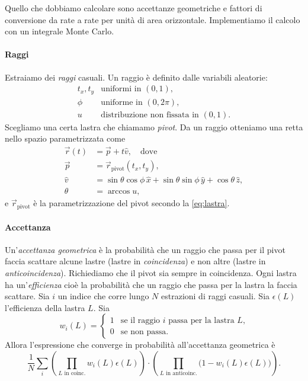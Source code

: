 Quello che dobbiamo calcolare sono accettanze geometriche
e fattori di conversione da rate a rate per unità di area orizzontale.
Implementiamo il calcolo con un integrale Monte Carlo.

\paragraph{Raggi}

Estraiamo dei \emph{raggi} casuali.
Un raggio è definito dalle variabili aleatorie:
\begin{equation*}
	\begin{array}{ll}
		t_x, t_y & \text{uniformi in $(0,1)$}, \\
		\phi     & \text{uniforme in $(0,2\pi)$}, \\
		u        & \text{distribuzione non fissata in $(0,1)$}.
	\end{array}
\end{equation*}
Scegliamo una certa lastra che chiamamo \emph{pivot}.
Da un raggio otteniamo una retta nello spazio parametrizzata come
\begin{align*}
	\vec r(t) &= \vec p + t \hat v, \quad \text{dove} \\
	\vec p    &= \vec r_\text{pivot}(t_x, t_y), \\
	\hat v    &= \sin\theta\cos\phi\,\hat x + \sin\theta\sin\phi\,\hat y + \cos\theta\,\hat z, \\
	\theta    &= \arccos u,
\end{align*}
e $\vec r_\text{pivot}$ è la parametrizzazione del pivot secondo la \eqref{eq:lastra}.

\paragraph{Accettanza}

Un'\emph{accettanza geometrica} è la probabilità
che un raggio che passa per il pivot
faccia scattare alcune lastre (lastre in \emph{coincidenza})
e non altre (lastre in \emph{anticoincidenza}).
Richiediamo che il pivot sia sempre in coincidenza.
Ogni lastra ha un'\emph{efficienza}
cioè la probabilità che un raggio che passa per la lastra la faccia scattare.
Sia $i$ un indice che corre lungo $N$ estrazioni di raggi casuali.
Sia $\epsilon(L)$ l'efficienza della lastra $L$.
Sia
\begin{equation*}
	w_i(L) = \begin{cases}
		1 & \text{se il raggio $i$ passa per la lastra $L$,} \\
		0 & \text{se non passa.}
	\end{cases}
\end{equation*}
Allora l'espressione che converge in probabilità all'accettanza geometrica è
\begin{equation*}
	\frac1N \sum_i
	\left( \prod_\text{$L$ in coinc.} w_i(L) \epsilon(L) \right)
	\cdot \left( \prod_\text{$L$ in anticoinc.} \big(1 - w_i(L) \epsilon(L)\big) \right).
\end{equation*}

